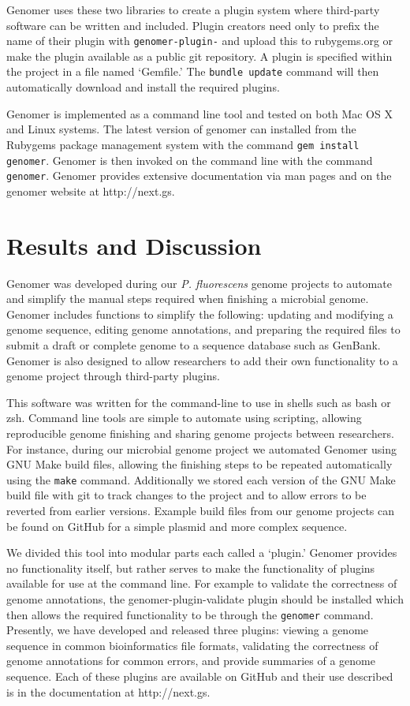 \documentclass[10pt]{article}
\begin{document}
Genomer uses these two libraries to create a plugin system where third-party
software can be written and included. Plugin creators need only to prefix the
name of their plugin with \verb+genomer-plugin-+ and upload this to
rubygems.org or make the plugin available as a public git repository. A plugin
is specified within the project in a file named `Gemfile.' The \verb+bundle update+
command will then automatically download and install the required plugins.

Genomer is implemented as a command line tool and tested on both Mac OS X and
Linux systems. The latest version of genomer can installed from the Rubygems
package management system with the command \verb+gem install genomer+. Genomer
is then invoked on the command line with the command \verb+genomer+. Genomer
provides extensive documentation via man pages and on the genomer website at
http://next.gs.

\section*{Results and Discussion}

Genomer was developed during our \emph{P. fluorescens} genome projects
\cite{barton2012} to automate and simplify the manual steps required when
finishing a microbial genome. Genomer includes functions to simplify the
following: updating and modifying a genome sequence, editing genome
annotations, and preparing the required files to submit a draft or complete
genome to a sequence database such as GenBank. Genomer is also designed to
allow researchers to add their own functionality to a genome project through
third-party plugins.

This software was written for the command-line to use in shells such as bash or
zsh. Command line tools are simple to automate using scripting, allowing
reproducible genome finishing and sharing genome projects between researchers.
For instance, during our microbial genome project we automated Genomer using
GNU Make build files, allowing the finishing steps to be repeated automatically
using the \verb+make+ command. Additionally we stored each version of the GNU
Make build file with git \cite{git-scm} to track changes to the project and to
allow errors to be reverted from earlier versions. Example build files from our
genome projects can be found on GitHub for a simple plasmid
\cite{plasmid-github} and more complex \cite{genome-github} sequence.

We divided this tool into modular parts each called a `plugin.' Genomer
provides no functionality itself, but rather serves to make the functionality
of plugins available for use at the command line. For example to validate the
correctness of genome annotations, the genomer-plugin-validate plugin should be
installed which then allows the required functionality to be through the
\verb+genomer+ command. Presently, we have developed and released three
plugins: viewing a genome sequence in common bioinformatics file formats,
validating the correctness of genome annotations for common errors, and provide
summaries of a genome sequence. Each of these plugins are available on GitHub
and their use described is in the documentation at http://next.gs.
\end{document}
